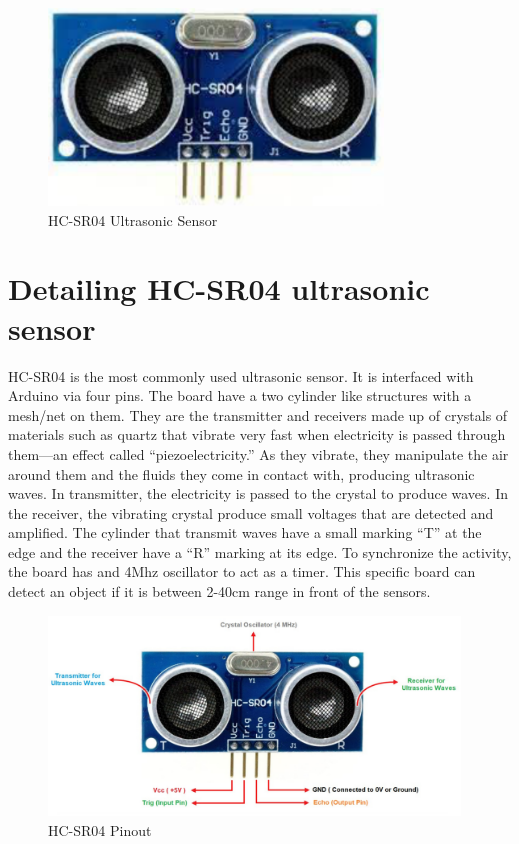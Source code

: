 \begin{figure}
    \centering
    \includegraphics[width=3.5in]{Images/Ultrasonic/board.png}
    \caption{HC-SR04 Ultrasonic Sensor}
\end{figure}

\section{Detailing HC-SR04 ultrasonic sensor}

\par HC-SR04 is the most commonly used ultrasonic sensor. It is interfaced with Arduino via four pins. The board have a two cylinder like structures with a mesh/net on them. They are the transmitter and receivers made up of crystals of materials such as quartz that vibrate very fast when electricity is passed through them—an effect called “piezoelectricity.” As they vibrate, they manipulate the air around them and the fluids they come in contact with, producing ultrasonic waves. In transmitter, the electricity is passed to the crystal to produce waves. In the receiver, the vibrating crystal produce small voltages that are detected and amplified. The cylinder that transmit waves have a small marking “T” at the edge and the receiver have a “R” marking at its edge. To synchronize the activity, the board has and 4Mhz oscillator to act as a timer. This specific board can detect an object if it is between 2-40cm range in front of the sensors.

\begin{figure}
	\centering
	\includegraphics[width=4.3in]{Images/Ultrasonic/pinout.png}
	\caption{HC-SR04 Pinout}
\end{figure}

